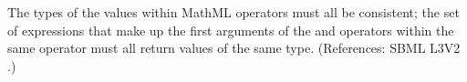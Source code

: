 The types of the values within MathML  operators must all
be consistent; \ie the set of expressions that make up the first
arguments of the  and  operators within the
same  operator must all return values of the same type.
(References: SBML L3V2 .)

